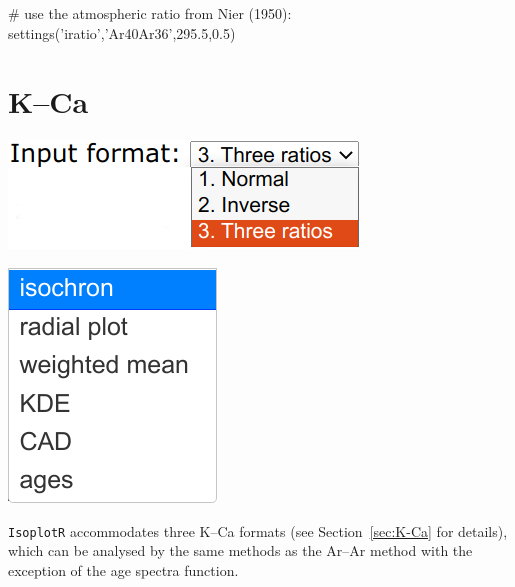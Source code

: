\begin{refsection}
\begin{script}
# use the atmospheric ratio from Nier (1950):
settings('iratio','Ar40Ar36',295.5,0.5)
\end{script}

\section{K--Ca}\label{sec:KCa-R}

\noindent\begin{minipage}[t]{.3\linewidth}
\strut\vspace*{-\baselineskip}\newline
\includegraphics[width=\linewidth]{../figures/PbPbFormats.png}
\end{minipage}
\noindent\begin{minipage}[t]{.15\linewidth}
\strut\vspace*{-\baselineskip}\newline
\includegraphics[width=\linewidth]{../figures/PbPbPlotdevices.png}
\end{minipage}
\begin{minipage}[t]{.55\textwidth}
  \texttt{IsoplotR} accommodates three K--Ca formats (see
  Section~\ref{sec:K-Ca} for details), which can be analysed by the
  same methods as the Ar--Ar method with the exception of the age
  spectra function.
\end{minipage}


\end{refsection}

